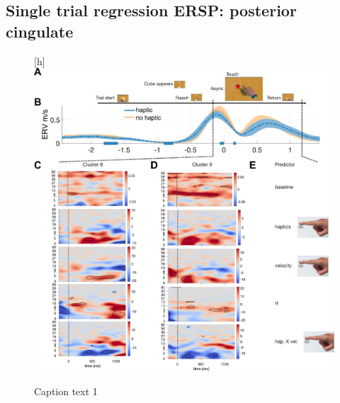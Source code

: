 
\subsection{Single trial regression ERSP: posterior cingulate}

\begin{figure}{\textwidth}[h]
    \centering\includegraphics[width=\textwidth]{figures/fig3_ersp_single_trial.pdf}
    \label{st_ersp}
    \caption{Caption text 1}
\end{figure}